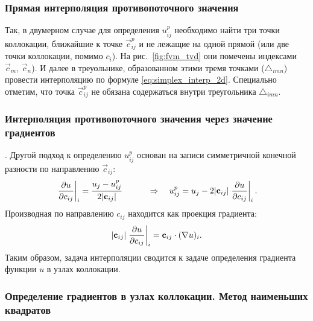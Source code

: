 \subsubsection{Прямая интерполяция противопоточного значения}
\label{sec:direct_interpolate_up}
Так, в двумерном случае для определения $u^p_{ij}$
необходимо найти три точки коллокации,
ближайшие к точке $\vec c^p_{ij}$ и не лежащие на одной прямой (или две точки коллокации, помимо $c_i$). На рис.~\ref{fig:fvm_tvd}
они помечены индексами $\vec c_m$, $\vec c_n$).
И далее в треуольнике, образованном этими тремя
точками ($\triangle_{imn}$) провести
интерполяцию
по формуле \cref{eq:simplex_interp_2d}.
Специально отметим, что точка $\vec c^p_{ij}$
не обязана содержаться внутри 
треугольника $\triangle_{imn}$.

\subsubsection{Интерполяция противопоточного значения через значение градиентов}
\label{sec:grad_inteprolate_up}.
Другой подход к определению $u^p_{ij}$ основан на записи симметричной конечной разности
по направлению $\vec c_{ij}$:
\begin{equation*}
\left.\frac{\partial u}{\partial c_{ij}}\right|_i = \frac{u_j - u^p_{ij}}{2|\boldsymbol{\rm c}_{ij}|} \qquad \quad\Rightarrow\quad
u_{ij}^p = u_j - 2 |\boldsymbol{\rm c}_{ij}| \left. \frac{\partial u}{\partial c_{ij}}\right|_i.
\end{equation*}
Производная по направлению $c_{ij}$ находится как проекция градиента:
\begin{equation*}
|\boldsymbol{\rm c}_{ij}| \left.\frac{\partial u}{\partial c_{ij}}\right|_i = \boldsymbol{\rm c}_{ij} \cdot (\nabla u)_i.
\end{equation*}
Таким образом, задача интерполяции сводится к задаче определения градиента функции
$u$ в узлах коллокации.

\subsubsection{Определение градиентов в узлах коллокации. Метод наименьших квадратов}

